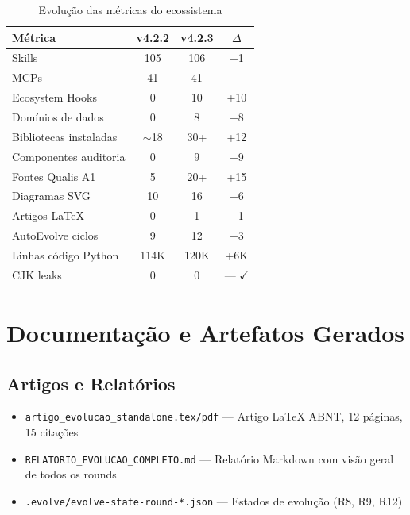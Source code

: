 \documentclass[12pt,a4paper]{article}
\begin{document}
\begin{table}[H]
  \centering
  \caption{Evolução das métricas do ecossistema}
  \label{tab:metrics}
  \begin{tabular}{l c c c}
    \toprule
    \textbf{Métrica} & \textbf{v4.2.2} & \textbf{v4.2.3} & \textbf{$\Delta$} \\
    \midrule
    Skills                 & 105  & 106  & +1 \\
    MCPs                   & 41   & 41   & --- \\
    Ecosystem Hooks        & 0    & 10   & +10 \\
    Domínios de dados      & 0    & 8    & +8 \\
    Bibliotecas instaladas & $\sim$18 & 30+ & +12 \\
    Componentes auditoria  & 0    & 9    & +9 \\
    Fontes Qualis A1       & 5    & 20+  & +15 \\
    Diagramas SVG          & 10   & 16   & +6 \\
    Artigos LaTeX          & 0    & 1    & +1 \\
    AutoEvolve ciclos      & 9    & 12   & +3 \\
    Linhas código Python   & 114K & 120K & +6K \\
    CJK leaks              & 0    & 0    & --- $\checkmark$ \\
    \bottomrule
  \end{tabular}
\end{table}

\section{Documentação e Artefatos Gerados}

\subsection{Artigos e Relatórios}

\begin{itemize}[itemsep=1pt]
  \item \texttt{artigo\_evolucao\_standalone.tex/pdf} --- Artigo LaTeX ABNT, 12 páginas, 15 citações
  \item \texttt{RELATORIO\_EVOLUCAO\_COMPLETO.md} --- Relatório Markdown com visão geral de todos os rounds
  \item \texttt{.evolve/evolve-state-round-*.json} --- Estados de evolução (R8, R9, R12)
\end{itemize}
\end{document}
